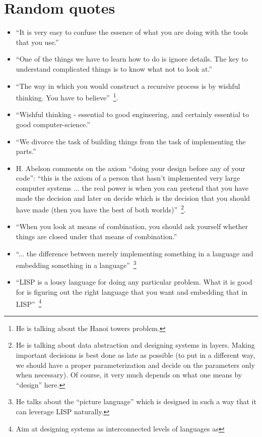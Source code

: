 \documentclass[12pt,a4paper]{article}
\begin{document}
\appendix
\appendixpage

\section{Random quotes}

\begin{itemize}
\item ``It is very easy to confuse the essence of what you are doing with the tools that
  you use.''
\item ``One of the things we have to learn how to do is ignore details. The key to
  understand complicated things is to know what not to look at.''
\item ``The way in which you would construct a recursive process is by wishful thinking.
  You have to believe''~\footnote{He is talking about the Hanoi towers problem.}.
\item ``Wishful thinking - essential to good engineering, and certainly essential to good
  computer-science.''
\item ``We divorce the task of building things from the task of implementing the parts.''
\item H. Abelson comments on the axiom ``doing your design before any of your code'':
  ``this is the axiom of a person that hasn't implemented very large computer systems
  ... the real power is when you can pretend that you have made the decision and later
  on decide which is the decision that you should have made (then you have the best of
  both worlds)''~\footnote{He is talking about data abstraction and designing systems in
  layers. Making important decisions is best done as late as possible (to put in a
  different way, we should have a proper parameterization and decide on the parameters
  only when necessary). Of course, it very much depends on what one means by ``design''
  here.}.
\item ``When you look at means of combination, you should ask yourself whether things
  are closed under that means of combination.''
\item ``... the difference between merely implementing something in a language and
  embedding something in a language''~\footnote{He talks about the ``picture language''
  which is designed in such a way that it can leverage LISP naturally.}
\item ``LISP is a lousy language for doing any particular problem. What it is good for
  is figuring out the right language that you want and embedding that in
  LISP''~\footnote{Aim at designing systems as interconnected levels of languages as
}
\end{itemize}
\end{document}

